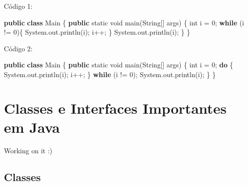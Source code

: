 \documentclass[
]{book}
\newenvironment{Shaded}{\begin{snugshade}}{\end{snugshade}}
\newcommand{\BuiltInTok}[1]{#1}
\newcommand{\DataTypeTok}[1]{\textcolor[rgb]{0.13,0.29,0.53}{#1}}
\newcommand{\DecValTok}[1]{\textcolor[rgb]{0.00,0.00,0.81}{#1}}
\newcommand{\FunctionTok}[1]{\textcolor[rgb]{0.00,0.00,0.00}{#1}}
\newcommand{\KeywordTok}[1]{\textcolor[rgb]{0.13,0.29,0.53}{\textbf{#1}}}
\newcommand{\NormalTok}[1]{#1}
\begin{document}
Código 1:

\begin{Shaded}
\begin{Highlighting}[]
\KeywordTok{public} \KeywordTok{class}\NormalTok{ Main \{}
    \KeywordTok{public} \DataTypeTok{static} \DataTypeTok{void} \FunctionTok{main}\NormalTok{(}\BuiltInTok{String}\NormalTok{[] args) \{}
        \DataTypeTok{int}\NormalTok{ i = }\DecValTok{0}\NormalTok{;}
        \KeywordTok{while}\NormalTok{ (i != }\DecValTok{0}\NormalTok{)\{}
            \BuiltInTok{System}\NormalTok{.}\FunctionTok{out}\NormalTok{.}\FunctionTok{println}\NormalTok{(i);}
\NormalTok{            i++;}
\NormalTok{        \}}
        \BuiltInTok{System}\NormalTok{.}\FunctionTok{out}\NormalTok{.}\FunctionTok{println}\NormalTok{(i);}
\NormalTok{    \}}
\NormalTok{\}}
\end{Highlighting}
\end{Shaded}

Código 2:

\begin{Shaded}
\begin{Highlighting}[]
\KeywordTok{public} \KeywordTok{class}\NormalTok{ Main \{}
    \KeywordTok{public} \DataTypeTok{static} \DataTypeTok{void} \FunctionTok{main}\NormalTok{(}\BuiltInTok{String}\NormalTok{[] args) \{}
        \DataTypeTok{int}\NormalTok{ i = }\DecValTok{0}\NormalTok{;}
        \KeywordTok{do}\NormalTok{ \{}
            \BuiltInTok{System}\NormalTok{.}\FunctionTok{out}\NormalTok{.}\FunctionTok{println}\NormalTok{(i);}
\NormalTok{            i++;}
\NormalTok{        \} }\KeywordTok{while}\NormalTok{ (i != }\DecValTok{0}\NormalTok{);}
        \BuiltInTok{System}\NormalTok{.}\FunctionTok{out}\NormalTok{.}\FunctionTok{println}\NormalTok{(i);}
\NormalTok{    \}}
\NormalTok{\}}
\end{Highlighting}
\end{Shaded}

\hypertarget{classes-e-interfaces-importantes-em-java}{%
\chapter{Classes e Interfaces Importantes em Java}\label{classes-e-interfaces-importantes-em-java}}

Working on it :)

\hypertarget{classes-1}{%
\section{Classes}\label{classes-1}}
\end{document}
